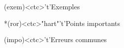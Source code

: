 \documentclass[../../main/main.tex]{subfiles}
\begin{document}
\begin{tcn}[sidebyside, fontupper=\small, fontlower=\small]
	\begin{tcn}(exem)<ctc>'t'{Exemples}
	\end{tcn}
	\begin{tcn}*(ror)<ctc>"hart"'t'{Points importants}
	\end{tcn}
	\begin{tcn}(impo)<ctc>'t'{Erreurs communes}
	\end{tcn}
\end{tcn}

\vspace*{\fill}
\newpage
\end{document}
